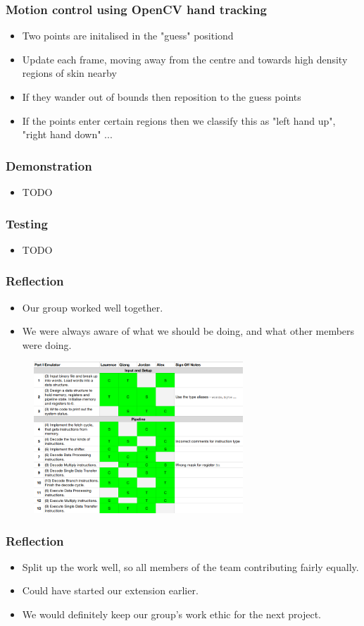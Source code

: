 \documentclass{beamer}
\begin{document}
\begin{frame}
\frametitle{Motion control using OpenCV {hand tracking}}
\begin{itemize}
	\item Two points are initalised in the "guess" positiond
	\item Update each frame, moving away from the centre and towards high density regions of skin nearby
	\item If they wander out of bounds then reposition to the guess points
	\item If the points enter certain regions then we classify this as "left hand up", "right hand down" ...
\end{itemize}
\end{frame}

\begin{frame}
\frametitle{Demonstration}
\begin{itemize}
	\item TODO
\end{itemize}
\end{frame}

\begin{frame}
\frametitle{Testing}
\begin{itemize}
	\item TODO
\end{itemize}
\end{frame}

\begin{frame}
\frametitle{Reflection}
\begin{itemize}
	\item Our group worked well together.
	\item We were always aware of what we should be doing, and what other members were doing.
\end{itemize}
\begin{figure}
	\includegraphics[width=0.7\textwidth]{Presentation/spreadsheet.png}
\end{figure}
\end{frame}

\begin{frame}
\frametitle{Reflection}
\begin{itemize}
	\item Split up the work well, so all members of the team contributing fairly equally.
	\item Could have started our extension earlier.
	\item We would definitely keep our group’s work ethic for the next project.
\end{itemize}
\end{frame}
\end{document}
